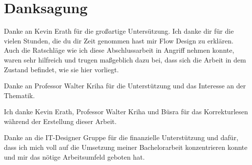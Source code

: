 \chapter*{Danksagung}

Danke an Kevin Erath für die großartige Untersützung.
Ich danke dir für die vielen Stunden, die du dir Zeit genommen hast mir Flow
Design zu erklären.
Auch die Ratschläge wie ich diese Abschlussarbeit in Angriff nehmen konnte, waren sehr
hilfreich und trugen maßgeblich dazu bei, dass sich die Arbeit in dem Zustand 
befindet, wie sie hier vorliegt.

Danke an Professor Walter Kriha für die Unterstützung und das Interesse an der Thematik.

Ich danke Kevin Erath, Professor Walter Kriha und Büsra für das Korrekturlesen
während der Erstellung dieser Arbeit.

Danke an die IT-Designer Gruppe für die finanzielle Unterstützung
und dafür, dass ich mich voll auf die Umsetzung meiner Bachelorarbeit konzentrieren konnte
und mir das nötige Arbeitsumfeld geboten hat.







